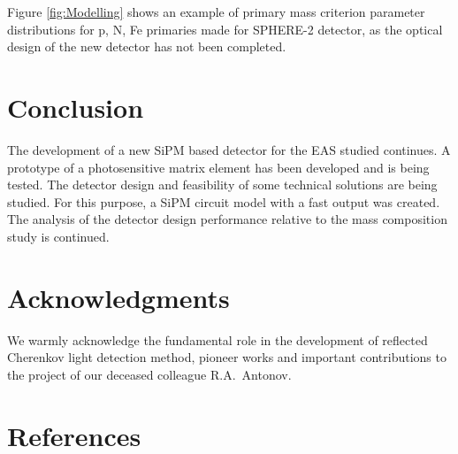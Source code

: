 \documentclass[a4paper]{jpconf}
\begin{document}
Figure \ref{fig:Modelling} shows an example of primary mass criterion parameter distributions for p, N, Fe primaries made for SPHERE-2 detector, as the optical design of the new detector has not been completed.




\section{Conclusion}
The development of a new SiPM based detector for the EAS studied continues. A prototype of a photosensitive matrix element has been developed and is being tested. The detector design and feasibility of some technical solutions are being studied.  For this purpose, a SiPM circuit model with a fast output was created. The analysis of the detector design performance relative to the mass composition study is continued.

\section{Acknowledgments}
We warmly acknowledge the fundamental role in the development of reflected Cherenkov light detection method, pioneer works and important contributions to the project of our deceased colleague R.A.~Antonov.

\section{References}

\end{document}
